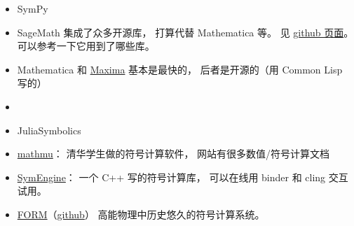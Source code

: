 
\begin{issues}
\issueDraft
\end{issues}

\begin{itemize}
\item SymPy
\item SageMath 集成了众多开源库， 打算代替 Mathematica 等。 见 \href{https://github.com/sagemath/sage/}{github 页面}。 可以参考一下它用到了哪些库。
\item Mathematica 和 \href{https://maxima.sourceforge.io/}{Maxima} 基本是最快的， 后者是开源的（用 Common Lisp 写的）
\item 
\item JuliaSymbolics
\item \href{http://mathmu.github.io/MTCAS/RecentChanges.html}{mathmu}： 清华学生做的符号计算软件， 网站有很多数值/符号计算文档
\item \href{https://github.com/symengine/symengine}{SymEngine}： 一个 C++ 写的符号计算库， 可以在线用 binder 和 cling 交互试用。
\item \href{https://www.nikhef.nl/~form/}{FORM}（\href{https://github.com/vermaseren/form}{github}） 高能物理中历史悠久的符号计算系统。
\end{itemize}
